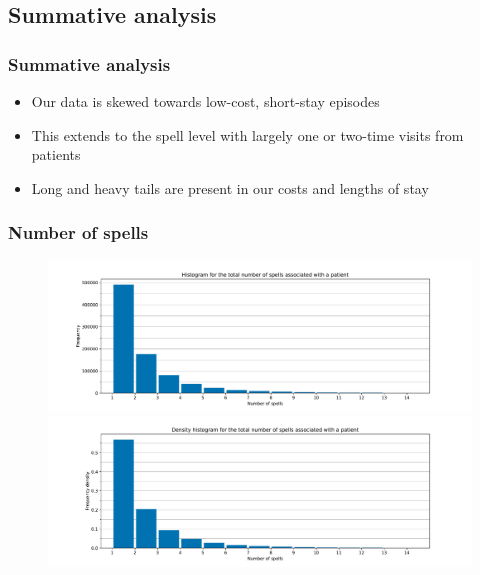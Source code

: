 \documentclass{beamer}
\begin{document}
\subsection{Summative analysis}
\begin{frame}
    \frametitle{Summative analysis}

    \begin{itemize}
        \pause%
        \item Our data is skewed towards low-cost, short-stay episodes
        \pause%
        \item This extends to the spell level with largely one or two-time
            visits from patients
        \pause%
        \item Long and heavy tails are present in our costs and lengths of stay
    \end{itemize}
\end{frame}

\begin{frame}
    \frametitle{Number of spells}

    \begin{figure}
        \begin{minipage}{\linewidth}
            \includegraphics[width=\linewidth]{./img/no_spells_freq_hist.pdf}
        \end{minipage}
        \begin{minipage}{\linewidth}
            \includegraphics[width=\linewidth]{./img/no_spells_density_hist.pdf}
        \end{minipage}
    \end{figure}
\end{frame}
\end{document}
